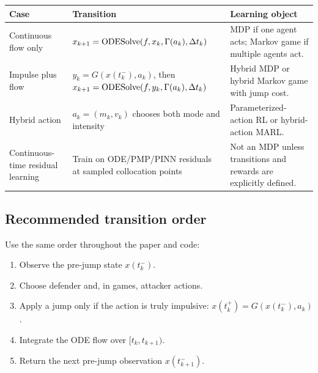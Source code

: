 \documentclass[11pt,a4paper]{article}
\begin{document}
\begin{longtable}{p{}p{}p{}}
\toprule
Case & Transition & Learning object \\
\midrule
Continuous flow only &
$x_{k+1}=\operatorname{ODESolve}(f,x_k,\Gamma(a_k),\Delta t_k)$ &
MDP if one agent acts; Markov game if multiple agents act. \\
Impulse plus flow &
$y_k=G(x(t_k^-),a_k)$, then $x_{k+1}=\operatorname{ODESolve}(f,y_k,\Gamma(a_k),\Delta t_k)$ &
Hybrid MDP or hybrid Markov game with jump cost. \\
Hybrid action &
$a_k=(m_k,v_k)$ chooses both mode and intensity &
Parameterized-action RL or hybrid-action MARL. \\
Continuous-time residual learning &
Train on ODE/PMP/PINN residuals at sampled collocation points &
Not an MDP unless transitions and rewards are explicitly defined. \\
\bottomrule
\end{longtable}

\subsection{Recommended transition order}
Use the same order throughout the paper and code:
\begin{enumerate}
\item Observe the pre-jump state $x(t_k^-)$.
\item Choose defender and, in games, attacker actions.
\item Apply a jump only if the action is truly impulsive:
$x(t_k^+)=G(x(t_k^-),a_k)$.
\item Integrate the ODE flow over $[t_k,t_{k+1})$.
\item Return the next pre-jump observation $x(t_{k+1}^-)$.
\end{enumerate}
\end{document}
